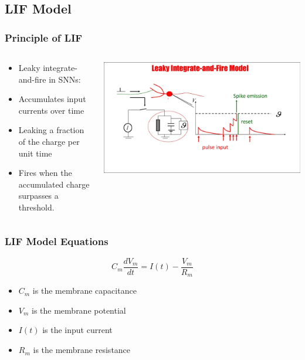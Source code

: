 \documentclass[aspectratio=169, 11pt]{beamer}
\begin{document}
\subsection{LIF Model}
\begin{frame}
  \frametitle{Principle of LIF}
  \begin{columns}
    \begin{column}{0.5\textwidth}
      \begin{itemize}
        \item Leaky integrate-and-fire in SNNs:
        \item Accumulates input currents over time
        \item Leaking a fraction of the charge per unit time
        \item Fires when the accumulated charge surpasses a threshold.
      \end{itemize}
    \end{column}
    \begin{column}{0.5\textwidth}
      \includegraphics[width=\textwidth]{image/lif.png}
    \end{column}
  \end{columns}
\end{frame}

\begin{frame}
  \frametitle{LIF Model Equations}
  $$ C_m \frac{d V_m}{d t} = I(t) - \frac{V_m}{R_m} $$
  \begin{itemize}
    \item $C_m$ is the membrane capacitance
    \item $V_m$ is the membrane potential
    \item $I(t)$ is the input current
    \item $R_m$ is the membrane resistance
  \end{itemize}
\end{frame}
\end{document}
